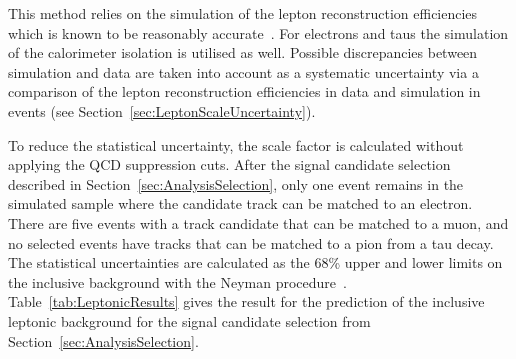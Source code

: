 This method relies on the simulation of the lepton reconstruction efficiencies which is known to be reasonably accurate~\cite{bib:CMS:elec_recoEff,bib:CMS:muon_recoEff,bib:CMS:TauReconstruction_7TeV}.
For electrons and taus the simulation of the calorimeter isolation is utilised as well.
Possible discrepancies between simulation and data are taken into account as a systematic uncertainty via a comparison of the lepton reconstruction efficiencies in data and simulation in \Zlep events (see Section~\ref{sec:LeptonScaleUncertainty}).

To reduce the statistical uncertainty, the scale factor is calculated without applying the QCD suppression cuts. 
After the signal candidate selection described in Section~\ref{sec:AnalysisSelection}, only one event remains in the simulated \WJets sample where the candidate track can be matched to an electron.
There are five events with a track candidate that can be matched to a muon, and no selected events have tracks that can be matched to a pion from a tau decay.
The statistical uncertainties are calculated as the 68\% upper and lower limits on the inclusive background with the Neyman procedure~\cite{bib:Neyman_1937,bib:PDG_2014}.
Table~\ref{tab:LeptonicResults} gives the result for the prediction of the inclusive leptonic background for the signal candidate selection from Section~\ref{sec:AnalysisSelection}.

\renewcommand{\arraystretch}{1.5}
\begin{table}[!h]
\centering
\caption{Scale factor \leptonscalefactor, number of events in the data control region N$_{\text{CR,data}}$ and the resulting inclusive estimation N$_{\text{predicted}}$ after the candidate track selection.}
\label{tab:LeptonicResults}
\end{table}


